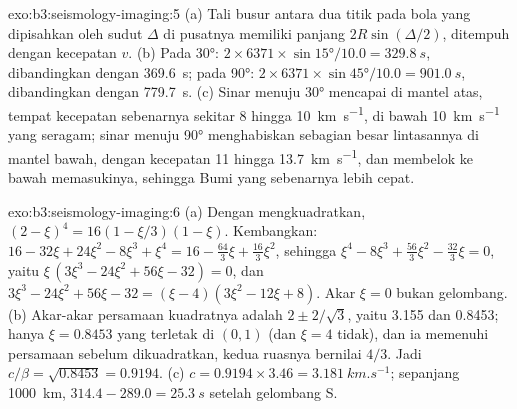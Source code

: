 \begin{solution}{exo:b3:seismology-imaging:5}
(a) Tali busur antara dua titik pada bola yang dipisahkan oleh sudut $\Delta$
di pusatnya memiliki panjang $2R\sin(\Delta/2)$, ditempuh dengan kecepatan $v$.
(b) Pada \ang{30}: $2\times6371\times\sin\ang{15}/10.0 = \qty{329.8}{s}$, dibandingkan
dengan \qty{369.6}{s}; pada \ang{90}: $2\times6371\times\sin\ang{45}/10.0 =
\qty{901.0}{s}$, dibandingkan dengan \qty{779.7}{s}. (c) Sinar menuju \ang{30} mencapai  di
mantel atas, tempat kecepatan sebenarnya sekitar 8 hingga \qty{10}{km.s^{-1}}, di bawah
\qty{10}{km.s^{-1}} yang seragam; sinar menuju \ang{90} menghabiskan sebagian besar lintasannya di
mantel bawah, dengan kecepatan 11 hingga \qty{13.7}{km.s^{-1}}, dan membelok ke bawah memasukinya, sehingga
Bumi yang sebenarnya lebih cepat.
\end{solution}

\begin{solution}{exo:b3:seismology-imaging:6}
(a) Dengan mengkuadratkan, $(2 - \xi)^4 = 16(1 - \xi/3)(1 - \xi)$. Kembangkan:
$16 - 32\xi + 24\xi^2 - 8\xi^3 + \xi^4 = 16 - \tfrac{64}{3}\xi + \tfrac{16}{3}\xi^2$,
sehingga $\xi^4 - 8\xi^3 + \tfrac{56}{3}\xi^2 - \tfrac{32}{3}\xi = 0$, yaitu
$\xi\,(3\xi^3 - 24\xi^2 + 56\xi - 32) = 0$, dan
$3\xi^3 - 24\xi^2 + 56\xi - 32 = (\xi - 4)(3\xi^2 - 12\xi + 8)$. Akar
$\xi = 0$ bukan gelombang. (b) Akar-akar persamaan kuadratnya adalah $2 \pm 2/\sqrt3$,
yaitu 3.155 dan 0.8453; hanya $\xi = 0.8453$ yang terletak di $(0, 1)$ (dan $\xi = 4$
tidak), dan ia memenuhi persamaan sebelum dikuadratkan, kedua ruasnya bernilai $4/3$.
Jadi $c/\beta = \sqrt{0.8453} = 0.9194$. (c) $c = 0.9194\times3.46 =
\qty{3.181}{km.s^{-1}}$; sepanjang \qty{1000}{km}, $314.4 - 289.0 = \qty{25.3}{s}$
setelah gelombang S.
\end{solution}

